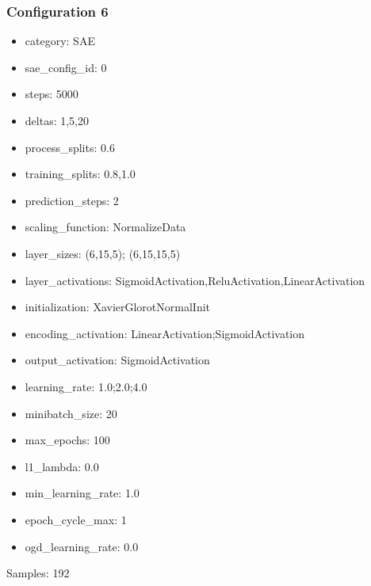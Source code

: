 \documentclass[a4paper,11pt,oneside]{article}
\theoremstyle{plain}
\theoremstyle{definition}
\begin{document}
	\subsubsection{Configuration 6}\label{config6}
	\begin{itemize}
		\item category: SAE
		\item sae\_config\_id: 0
		\item steps: 5000
		\item deltas: 1,5,20
		\item process\_splits: 0.6
		\item training\_splits: 0.8,1.0
		\item prediction\_steps: 2
		\item scaling\_function: NormalizeData
		\item layer\_sizes: (6,15,5); (6,15,15,5)
		\item layer\_activations: SigmoidActivation,ReluActivation,LinearActivation
		\item initialization: XavierGlorotNormalInit
		\item encoding\_activation: LinearActivation;SigmoidActivation
		\item output\_activation: SigmoidActivation
		\item learning\_rate: 1.0;2.0;4.0
		\item minibatch\_size: 20
		\item max\_epochs: 100
		\item l1\_lambda: 0.0
		\item min\_learning\_rate: 1.0
		\item epoch\_cycle\_max: 1
		\item ogd\_learning\_rate: 0.0
	\end{itemize}
	
	Samples: 192
	
\end{document}
